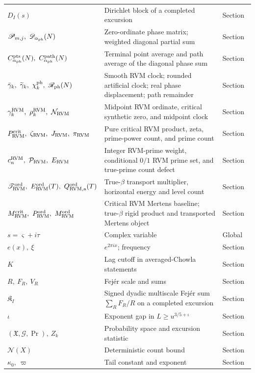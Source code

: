 \documentclass[11pt,reqno]{amsart}
\makeatletter
\let\CG@origref\ref
\newcommand{\CG@gettip}[1]{\@ifundefined{CGTip@#1}{Reference: #1}{\csname CGTip@#1\endcsname}}
\DeclareRobustCommand{\CGref}[1]{\pdftooltip{\CG@origref{#1}}{\CG@gettip{#1}}}
\numberwithin{equation}{section}
\theoremstyle{plain}
\theoremstyle{definition}
\theoremstyle{remark}
\makeatother
\begin{document}
\begin{longtable}{@{}p{}p{}p{}@{}}
$D_I(s)$ & Dirichlet block of a completed excursion & Section~\CGref{sec:criteria}\\
$\mathscr P_{m,j},\ \mathscr D_{\alpha_{\rm ph}}(N)$ & Zero-ordinate phase matrix; weighted diagonal partial sum & Section~\CGref{sec:diagonal-zero-phases}\\
$C_{\alpha_{\rm ph}}^{\rm pts}(N),\ C_{\alpha_{\rm ph}}^{\rm path}(N)$ & Terminal point average and path average of the diagonal phase sum & Section~\CGref{sec:diagonal-zero-phases}\\
$\bar\gamma_k,\ \widetilde\gamma_k,\ \chi_k^{\rm ph},\ \mathscr R_{\rm ph}(N)$ & Smooth RVM clock; rounded artificial clock; real phase displacement; path remainder & Section~\CGref{sec:diagonal-zero-phases}\\
$\gamma_k^{\rm RVM},\ \rho_k^{\rm RVM},\ \mathcal N_{\rm RVM}$ & Midpoint RVM ordinate, critical synthetic zero, and midpoint clock & Section~\CGref{sec:RVM-pole-transport}\\
$P_{\rm RVM}^{\rm crit},\ \zeta_{\rm RVM},\ J_{\rm RVM},\ \pi_{\rm RVM}$ & Pure critical RVM product, zeta, prime-power count, and prime count & Section~\CGref{sec:RVM-pole-transport}\\
$c_n^{\rm RVM},\ \mathcal P_{\rm RVM},\ E_{\rm RVM}$ & Integer RVM-prime weight, conditional $0/1$ RVM prime set, and true-prime count defect & Section~\CGref{sec:RVM-pole-transport}\\
$\mathscr T_{\rm RVM}^{\rm ord},\ E_{\rm RVM}^{\rm ord}(T),\ Q_{\rm RVM,a}^{\rm ord}(T)$ & True-$\beta$ transport multiplier, horizontal energy and level count & Section~\CGref{sec:RVM-pole-transport}\\
$M_{\rm RVM}^{\rm crit},\ P_{\rm RVM}^{\rm ord},\ M_{\rm RVM}^{\rm ord}$ & Critical RVM Mertens baseline; true-$\beta$ rigid product and transported Mertens object & Section~\CGref{sec:RVM-pole-transport}\\
$s=\varsigma+i\tau$ & Complex variable & Global\\
$e(x),\ \xi$ & $e^{2\pi ix}$; frequency & Section~\CGref{sec:chowla}\\
$K$ & Lag cutoff in averaged-Chowla statements & Section~\CGref{sec:chowla}\\
$R,\ F_R,\ V_R$ & Fejér scale and sums & Section~\CGref{sec:chowla}\\
$\mathfrak K_I$ & Signed dyadic multiscale Fejér sum $\sum_R F_R/R$ on a completed excursion & Section~\CGref{subsec:multiscale-fejer}\\
$\iota$ & Exponent gap in $L\ge u^{3/5+\iota}$ & Section~\CGref{sec:chowla}\\
$(\mathfrak X,\mathcal G,\Pr),\ Z_k$ & Probability space and excursion statistic & Section~\CGref{sec:extreme}\\
$\mathcal N(X)$ & Deterministic count bound & Section~\CGref{sec:extreme}\\
$\kappa_0,\ \varpi$ & Tail constant and exponent & Section~\CGref{sec:extreme}\\
\bottomrule
\end{longtable}
\normalsize
\end{document}
